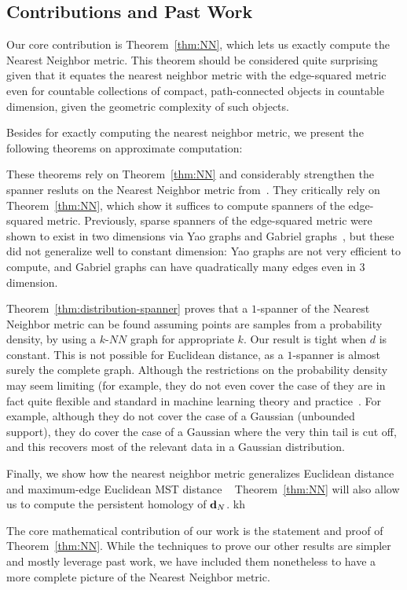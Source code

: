 \subsection{Contributions and Past Work}
Our core contribution is Theorem~\ref{thm:NN}, which lets us exactly
compute the Nearest Neighbor metric. This theorem should be considered
quite surprising given that it equates the nearest neighbor metric with the
edge-squared metric even for countable collections of compact,
path-connected objects in countable dimension, given the geometric
complexity of such objects.

 Besides for exactly computing the nearest neighbor metric, we present the
following theorems on approximate computation:

 
These theorems rely on Theorem~\ref{thm:NN} and considerably strengthen the
spanner resluts on the Nearest Neighbor metric
from~\cite{cohen15approximating}. They critically rely on
Theorem~\ref{thm:NN}, which show it suffices to compute spanners of the
edge-squared metric.
Previously, sparse spanners of the edge-squared metric were shown to exist in two
dimensions via Yao graphs and Gabriel graphs~\cite{LiWan2001}, but these
did not generalize well to constant dimension: Yao
graphs are not very efficient to compute, and Gabriel graphs can have
quadratically many edges even in $3$ dimension.  

Theorem~\ref{thm:distribution-spanner} proves that a $1$-spanner of
the Nearest Neighbor metric can be found assuming points are samples from a
probability density, by using a $k$-$NN$ graph for
appropriate $k$. Our result is tight when $d$ is constant. This
is not possible for Euclidean distance, as a $1$-spanner is almost
surely the complete graph. Although the restrictions on the probability
density may seem limiting (for example, they do not even cover the case of
they are in fact quite flexible and standard in
machine learning theory and practice~\cite{}. For example, although they do not cover the case
of a Gaussian (unbounded support), they do cover the case of a Gaussian
where the very thin tail is cut off, and this recovers most of the relevant
data in a Gaussian distribution.

Finally, we show how the nearest neighbor metric generalizes Euclidean
distance and maximum-edge Euclidean MST distance ~\cite{LiWan2001}
Theorem~\ref{thm:NN} will also allow us
to compute the persistent homology of $\mathbf{d}_N$. kh

The core mathematical contribution of our work is the
statement and proof of Theorem~\ref{thm:NN}.  While the techniques to prove
our other results are simpler and mostly leverage past work, we have
included them
nonetheless to have a more complete picture of the Nearest Neighbor metric.

